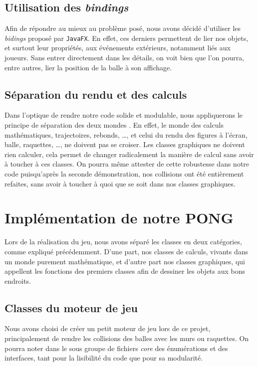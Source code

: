 \documentclass[a4paper,10pt]{article}
\theoremstyle{definition}
\begin{document}
    \subsection{Utilisation des \emph{bindings}}
    Afin de répondre au mieux au problème posé, nous avons décidé d'utiliser les \emph{bidings} proposé par \lstinline{JavaFX}. En effet, ces derniers permettent de lier nos objets, et surtout leur propriétés, aux événements extérieurs, notamment liés aux joueurs. Sans entrer directement dans les détails, on voit bien que l'on pourra, entre autres, lier la position de la balle à son affichage.
    
    \subsection{Séparation du rendu et des calculs}
    Dans l'optique de rendre notre code solide et modulable, nous appliquerons le principe de \og séparation des deux mondes \fg{}. En effet, le monde des calculs mathématiques, trajectoires, rebonds, \dots, et celui du rendu des figures à l'écran, balle, raquettes, \dots, ne doivent pas se croiser. Les classes graphiques ne doivent rien calculer, cela permet de changer radicalement la manière de calcul sans avoir à toucher à ces classes. On pourra même attester de cette robustesse dans notre code puisqu'après la seconde démonstration, nos collisions ont été entièrement refaites, sans avoir à toucher à quoi que se soit dans nos classes graphiques.
    
\section{Implémentation de notre PONG}
%

Lors de la réalisation du jeu, nous avons séparé les classes en deux catégories, comme expliqué précédemment. D'une part, nos classes de calculs, vivants dans un monde purement mathématique, et d'autre part nos classes graphiques, qui appellent les fonctions des premiers classes afin de dessiner les objets aux bons endroits.

    \subsection{Classes du moteur de jeu}
    Nous avons choisi de créer un petit moteur de jeu lors de ce projet, principalement de rendre les collisions des balles avec les murs ou raquettes. On pourra noter dans le sous groupe de fichiers \emph{core} des énumérations et des interfaces, tant pour la lisibilité du code que pour sa modularité.
    	
\end{document}
